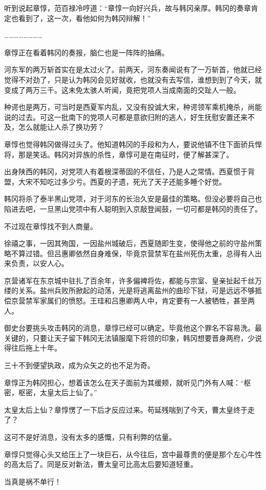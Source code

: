 听到说起章惇，范百禄冷哼道：“章惇一向好兴兵，故与韩冈亲厚。韩冈的奏章肯定也看到了，这一次，看他如何为韩冈辩解！”

……………………

章惇正在看着韩冈的奏报，脑仁也是一阵阵的抽痛。

河东军的两万斩首实在是太过火了。前两天，河东奏闻说有了一万斩首，他就已经觉得不对劲了，只是认为韩冈会见好就收，也就没有去写信，谁想到到了今天，就变成了两万三千。这未免太骇人听闻，竟把党项人当成南面的交趾人一般。

种谔也是两万，可当时是西夏军内乱，又没有投诚大宋，种谔领军乘机掩杀，尚能说的过去。可这一批南下的党项人可都是意欲归附的逃人，好生抚慰安置还来不及，怎么就能让人杀了换功劳？

章惇也觉得韩冈做得过头了。他知道韩冈的手段和为人，要说他镇不住下面骄兵悍将，那是笑话。韩冈对异族的杀性，章惇可是在南征时，便了解甚深了。

出身陕西的韩冈，对党项人有着根深蒂固的不信任，乃是人之常情。西夏惯于背盟，大宋不知吃过多少亏。西夏的孑遗，死光了天子还能多睡个好觉。

韩冈将杀了泰半黑山党项，对于河东的长治久安是最佳的策略。但没必要将自己也陷进去吧，一旦黑山党项中有人聪明到入京敲登闻鼓，一切可都是韩冈的责任了。

不过现在章惇找不到人商量。

徐禧之事，一因其殉国，一因盐州城破后，西夏随即生变，使得他之前的守盐州策略不算过错。但吕惠卿依然自身难保，毕竟京营禁军在盐州死伤太重，总得有人出来负责，以安人心。

京营诸军在东京城中驻扎了百余年，许多偏裨将佐，都能与宗室、皇亲扯起千丝万缕的关系。盐州兵败所掀起的动荡，光是将逃离盐州的曲珍下狱，可是远远不够抵偿京营禁军家属们的愤怒。王珪和吕惠卿两人中，肯定要有一人被牺牲，甚至两人。

御史台要挑头攻击韩冈的消息，章惇已经可以确定。毕竟他这个罪名不容易洗。最关键的，只要让天子留下韩冈无法镇服麾下将领的印象，韩冈想要晋身两府，少说得往后拖上十年。

三十不到便望执政，成为众矢之的也不足为奇。

章惇正为韩冈担心，想着该怎么在天子面前为其缓颊，就听见门外有人喊：“枢密，枢密，太皇太后上仙了。”

太皇太后上仙？章惇愣了一下后才反应过来。苟延残喘到了今天，曹太皇终于走了？

这可不是好消息，没有太多的感慨，只有利弊的估量。

章惇只觉得心头又给压上了一块巨石，从今往后，宫中最尊贵的便是那个左心牛性的高太后了。同是反对新法，曹太皇可比高太后要知道轻重。

当真是祸不单行！

